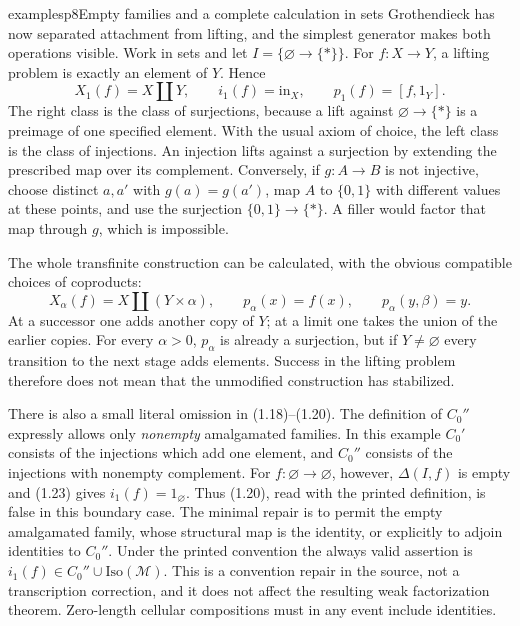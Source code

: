 
\begin{dcomment}{examples}{p8}{Empty families and a complete calculation in sets}
Grothendieck has now separated attachment from lifting, and the simplest generator makes both operations visible. Work in sets and let $I=\{\varnothing\to\{*\}\}$. For $f:X\to Y$, a lifting problem is exactly an element of $Y$. Hence
\[
 X_1(f)=X\amalg Y,\qquad i_1(f)=\mathrm{in}_X,
 \qquad p_1(f)=[f,1_Y].
\]
The right class is the class of surjections, because a lift against $\varnothing\to\{*\}$ is a preimage of one specified element. With the usual axiom of choice, the left class is the class of injections. An injection lifts against a surjection by extending the prescribed map over its complement. Conversely, if $g:A\to B$ is not injective, choose distinct $a,a'$ with $g(a)=g(a')$, map $A$ to $\{0,1\}$ with different values at these points, and use the surjection $\{0,1\}\to\{*\}$. A filler would factor that map through $g$, which is impossible.

The whole transfinite construction can be calculated, with the obvious compatible choices of coproducts:
\[
 X_\alpha(f)=X\amalg(Y\times\alpha),\qquad
 p_\alpha(x)=f(x),\qquad p_\alpha(y,\beta)=y.
\]
At a successor one adds another copy of $Y$; at a limit one takes the union of the earlier copies. For every $\alpha>0$, $p_\alpha$ is already a surjection, but if $Y\ne\varnothing$ every transition to the next stage adds elements. Success in the lifting problem therefore does not mean that the unmodified construction has stabilized.

There is also a small literal omission in (1.18)--(1.20). The definition of $C_0''$ expressly allows only \emph{nonempty} amalgamated families. In this example $C_0'$ consists of the injections which add one element, and $C_0''$ consists of the injections with nonempty complement. For $f:\varnothing\to\varnothing$, however, $\Delta(I,f)$ is empty and (1.23) gives $i_1(f)=1_{\varnothing}$. Thus (1.20), read with the printed definition, is false in this boundary case. The minimal repair is to permit the empty amalgamated family, whose structural map is the identity, or explicitly to adjoin identities to $C_0''$. Under the printed convention the always valid assertion is $i_1(f)\in C_0''\cup\mathrm{Iso}(\mathcal M)$. This is a convention repair in the source, not a transcription correction, and it does not affect the resulting weak factorization theorem. Zero-length cellular compositions must in any event include identities.
\end{dcomment}


